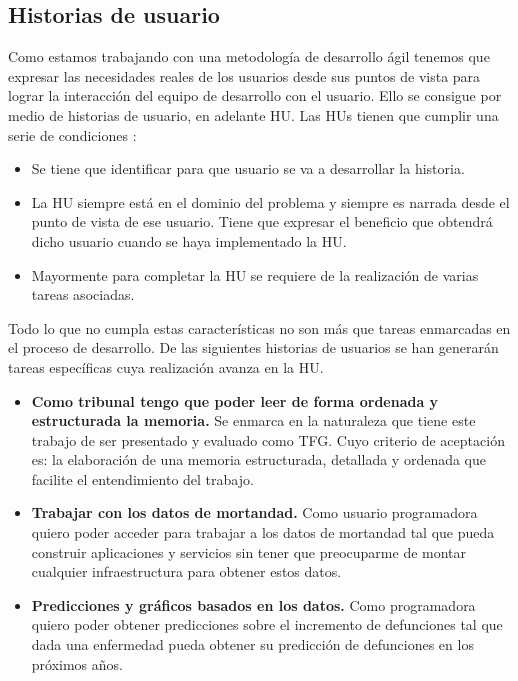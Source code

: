 \subsection{Historias de usuario}
\label{sec:hu2}
Como estamos trabajando con una metodología de desarrollo ágil tenemos que expresar las
necesidades reales de los usuarios desde sus puntos de vista para lograr la
interacción del equipo de desarrollo con el usuario. Ello se consigue por medio de
historias de usuario, en adelante HU. Las HUs tienen que cumplir una serie de condiciones \cite{dddjj}:
\begin{itemize}
    \item Se tiene que identificar para que usuario se va a desarrollar la historia.
    \item La HU siempre está en el dominio del problema y siempre es narrada desde el
    punto de vista de ese usuario. Tiene que expresar el beneficio que obtendrá dicho
    usuario cuando se haya implementado la HU.
    \item Mayormente para completar la HU se requiere de la realización de varias tareas
    asociadas. 
\end{itemize}
Todo lo que no cumpla estas características no son más que tareas enmarcadas en el proceso
de desarrollo. De las siguientes historias de usuarios se han generarán tareas específicas
cuya realización avanza en la HU.
\begin{itemize}
    \item \textbf{Como tribunal tengo que poder leer de forma ordenada y estructurada la
    memoria.} 
    Se enmarca en la naturaleza que tiene este trabajo de ser presentado y
    evaluado como TFG. Cuyo criterio de aceptación es: la elaboración de una memoria
    estructurada, detallada y ordenada que facilite el entendimiento del trabajo.

    \item \textbf{Trabajar con los datos de mortandad.}
    Como usuario programadora
    quiero poder acceder para trabajar a los datos de mortandad
    tal que pueda construir aplicaciones y servicios sin tener que preocuparme de montar cualquier infraestructura para obtener estos datos.

    \item \textbf{Predicciones y gráficos basados en los datos.}
    Como programadora quiero poder obtener predicciones sobre el incremento de defunciones
    tal que dada una enfermedad pueda obtener su predicción de defunciones en los próximos años.
\end{itemize}


